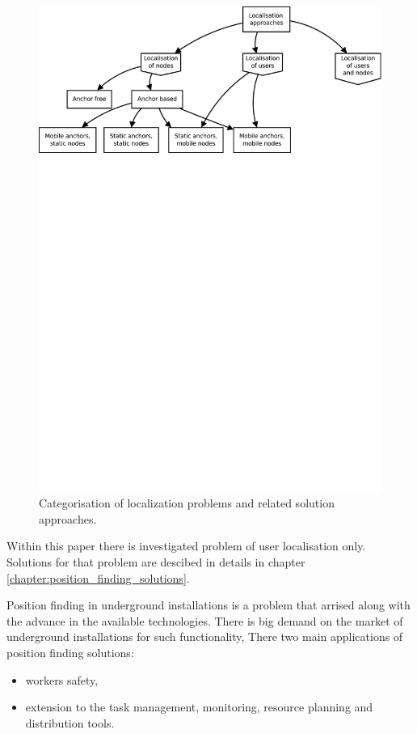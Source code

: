 \documentclass[../main.tex]{subfiles}
\begin{document}
\begin{figure}[ht]
\includegraphics[width=\textwidth, trim={0 20cm 0 0},clip]{pictures/localisation_approaches.pdf}
\centering
\caption{Categorisation of localization problems and related solution approaches\cite{discover_beacons_and_position}.}
\label{fig:localisation_approaches}
\end{figure}

Within this paper there is investigated problem of user localisation only. Solutions for that problem are descibed in details in chapter \ref{chapter:position_finding_solutions}.

Position finding in underground installations is a problem that arrised along with the advance in the available technologies. There is big demand on the market of underground installations for such functionality, There two main applications of position finding solutions:
\begin{itemize}
	\item workers safety,
	\item extension to the task management, monitoring, resource planning and distribution tools.
\end{itemize}
\end{document}
